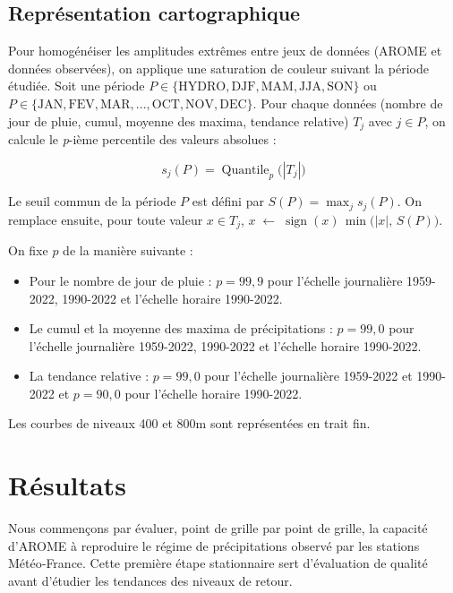 \documentclass[
  article,
  nofooter,
  noheadings]{jss}
\providecommand{\tightlist}{%
  \setlength{\itemsep}{0pt}\setlength{\parskip}{0pt}}
\begin{document}
\subsection{Représentation
cartographique}\label{repruxe9sentation-cartographique}

Pour homogénéiser les amplitudes extrêmes entre jeux de données (AROME
et données observées), on applique une saturation de couleur suivant la
période étudiée. Soit une période
\(P \in \{\text{HYDRO}, \text{DJF},\text{MAM},\text{JJA},\text{SON}\}\)
ou
\(P \in \{\text{JAN},\text{FEV},\text{MAR},\text{...},\text{OCT},\text{NOV},\text{DEC}\}\).
Pour chaque données (nombre de jour de pluie, cumul, moyenne des maxima,
tendance relative) \(T_j\) avec \(j \in P\), on calcule le \emph{p}-ième
percentile des valeurs absolues :

\[
s_j(P)=\operatorname{Quantile}_{p}\big(|T_j|\big)
\]

Le seuil commun de la période \(P\) est défini par
\(S(P)=\max_j s_j(P)\). On remplace ensuite, pour toute valeur
\(x\in T_j\),
\(x \;\leftarrow\; \operatorname{sign}(x)\,\min\big(|x|,\,S(P)\big)\).

On fixe \(p\) de la manière suivante :

\begin{itemize}
\tightlist
\item
  Pour le nombre de jour de pluie : \(p = 99,9\) pour l'échelle
  journalière 1959-2022, 1990-2022 et l'échelle horaire 1990-2022.
\item
  Le cumul et la moyenne des maxima de précipitations : \(p = 99,0\)
  pour l'échelle journalière 1959-2022, 1990-2022 et l'échelle horaire
  1990-2022.
\item
  La tendance relative : \(p = 99,0\) pour l'échelle journalière
  1959-2022 et 1990-2022 et \(p = 90,0\) pour l'échelle horaire
  1990-2022.
\end{itemize}

Les courbes de niveaux 400 et 800m sont représentées en trait fin.

\section{Résultats}\label{ruxe9sultats}

Nous commençons par évaluer, point de grille par point de grille, la
capacité d'AROME à reproduire le régime de précipitations observé par
les stations Météo‑France. Cette première étape stationnaire sert
d'évaluation de qualité avant d'étudier les tendances des niveaux de
retour.
\end{document}
